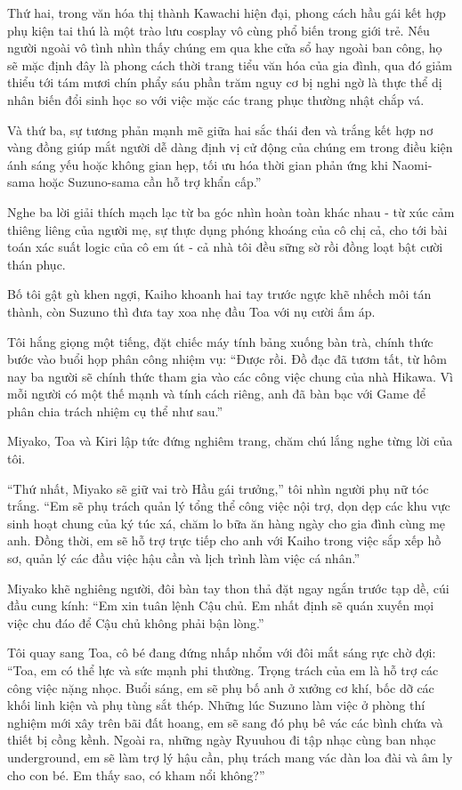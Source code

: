 \documentclass[../main.tex]{subfiles}
\begin{document}
Thứ hai, trong văn hóa thị thành Kawachi hiện đại, phong cách hầu gái kết hợp phụ kiện tai thú là một trào lưu cosplay vô cùng phổ biến trong giới trẻ. Nếu người ngoài vô tình nhìn thấy chúng em qua khe cửa sổ hay ngoài ban công, họ sẽ mặc định đây là phong cách thời trang tiểu văn hóa của gia đình, qua đó giảm thiểu tới tám mươi chín phẩy sáu phần trăm nguy cơ bị nghi ngờ là thực thể dị nhân biến đổi sinh học so với việc mặc các trang phục thường nhật chắp vá.

Và thứ ba, sự tương phản mạnh mẽ giữa hai sắc thái đen và trắng kết hợp nơ vàng đồng giúp mắt người dễ dàng định vị cử động của chúng em trong điều kiện ánh sáng yếu hoặc không gian hẹp, tối ưu hóa thời gian phản ứng khi Naomi-sama hoặc Suzuno-sama cần hỗ trợ khẩn cấp.''

Nghe ba lời giải thích mạch lạc từ ba góc nhìn hoàn toàn khác nhau - từ xúc cảm thiêng liêng của người mẹ, sự thực dụng phóng khoáng của cô chị cả, cho tới bài toán xác suất logic của cô em út - cả nhà tôi đều sững sờ rồi đồng loạt bật cười thán phục.

Bố tôi gật gù khen ngợi, Kaiho khoanh hai tay trước ngực khẽ nhếch môi tán thành, còn Suzuno thì đưa tay xoa nhẹ đầu Toa với nụ cười ấm áp.

Tôi hắng giọng một tiếng, đặt chiếc máy tính bảng xuống bàn trà, chính thức bước vào buổi họp phân công nhiệm vụ: ``Được rồi. Đồ đạc đã tươm tất, từ hôm nay ba người sẽ chính thức tham gia vào các công việc chung của nhà Hikawa. Vì mỗi người có một thế mạnh và tính cách riêng, anh đã bàn bạc với Game để phân chia trách nhiệm cụ thể như sau.''

Miyako, Toa và Kiri lập tức đứng nghiêm trang, chăm chú lắng nghe từng lời của tôi.

``Thứ nhất, Miyako sẽ giữ vai trò Hầu gái trưởng,'' tôi nhìn người phụ nữ tóc trắng. ``Em sẽ phụ trách quản lý tổng thể công việc nội trợ, dọn dẹp các khu vực sinh hoạt chung của ký túc xá, chăm lo bữa ăn hàng ngày cho gia đình cùng mẹ anh. Đồng thời, em sẽ hỗ trợ trực tiếp cho anh với Kaiho trong việc sắp xếp hồ sơ, quản lý các đầu việc hậu cần và lịch trình làm việc cá nhân.''

Miyako khẽ nghiêng người, đôi bàn tay thon thả đặt ngay ngắn trước tạp dề, cúi đầu cung kính: ``Em xin tuân lệnh Cậu chủ. Em nhất định sẽ quán xuyến mọi việc chu đáo để Cậu chủ không phải bận lòng.''

Tôi quay sang Toa, cô bé đang đứng nhấp nhổm với đôi mắt sáng rực chờ đợi: ``Toa, em có thể lực và sức mạnh phi thường. Trọng trách của em là hỗ trợ các công việc nặng nhọc. Buổi sáng, em sẽ phụ bố anh ở xưởng cơ khí, bốc dỡ các khối linh kiện và phụ tùng sắt thép. Những lúc Suzuno làm việc ở phòng thí nghiệm mới xây trên bãi đất hoang, em sẽ sang đó phụ bê vác các bình chứa và thiết bị cồng kềnh. Ngoài ra, những ngày Ryuuhou đi tập nhạc cùng ban nhạc underground, em sẽ làm trợ lý hậu cần, phụ trách mang vác dàn loa đài và âm ly cho con bé. Em thấy sao, có kham nổi không?''
\end{document}
